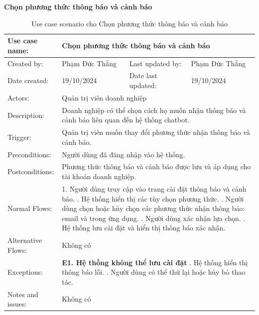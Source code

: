 \textbf{Chọn phương thức thông báo và cảnh báo}
\begin{table}[H]
\centering
\begin{tabular}{|l|l|l|l|}
\hline
Use case name: & \multicolumn{3}{|l|}{Chọn phương thức thông báo và cảnh báo} \\
\hline
Created by: & Phạm Đức Thắng & Last updated by: & Phạm Đức Thắng \\
\hline
Date created: & 19/10/2024 & Date last updated: & 19/10/2024 \\
\hline
Actors: & \multicolumn{3}{|l|}{Quản trị viên doanh nghiệp} \\
\hline
Description: & \multicolumn{3}{|p{12cm}|}{Doanh nghiệp có thể chọn cách họ muốn nhận thông báo và cảnh báo liên quan đến hệ thống chatbot.} \\
\hline
Trigger: & \multicolumn{3}{|p{12cm}|}{Quản trị viên muốn thay đổi phương thức nhận thông báo và cảnh báo.} \\
\hline
Preconditions: & \multicolumn{3}{|p{12cm}|}{Người dùng đã đăng nhập vào hệ thống.} \\
\hline
Postconditions: & \multicolumn{3}{|p{12cm}|}{Phương thức thông báo và cảnh báo được lưu và áp dụng cho tài khoản doanh nghiệp.} \\
\hline
Normal Flows: & \multicolumn{3}{|p{12cm}|}{
1. Người dùng truy cập vào trang cài đặt thông báo và cảnh báo. \newline
2. Hệ thống hiển thị các tùy chọn phương thức. \newline
3. Người dùng chọn hoặc hủy chọn các phương thức nhận thông báo: email và trong ứng dụng. \newline
4. Người dùng xác nhận lựa chọn. \newline
5. Hệ thống lưu cài đặt và hiển thị thông báo xác nhận.
}\\
\hline
Alternative Flows: & \multicolumn{3}{|p{12cm}|}{Không có} \\
\hline
Exceptions: & \multicolumn{3}{|p{12cm}|}{
\textbf{E1. Hệ thống không thể lưu cài đặt} \newline
5.1. Hệ thống hiển thị thông báo lỗi. \newline
5.2. Người dùng có thể thử lại hoặc hủy bỏ thao tác.
} \\
\hline
Notes and issues: & \multicolumn{3}{|p{12cm}|}{Không có} \\
\hline
\end{tabular}
\caption{Use case scenario cho Chọn phương thức thông báo và cảnh báo}
\end{table}

